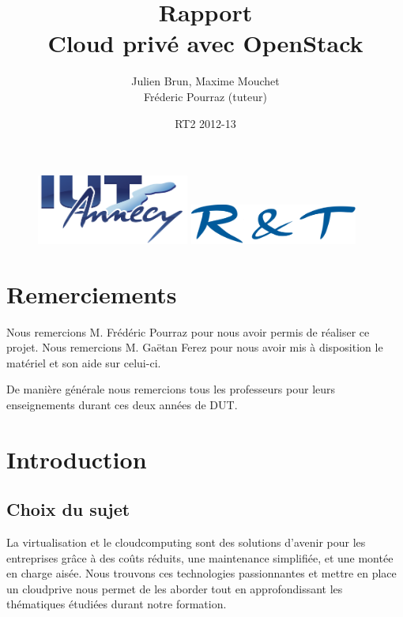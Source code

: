 \documentclass[a4paper,oneside]{report}
\title{Rapport \\ \og Cloud privé avec OpenStack \fg}
\author{Julien Brun, Maxime Mouchet \\ Fréderic Pourraz (tuteur)}
\date{RT2 2012-13}
\begin{document}
\begin{figure}
\includegraphics[width=5cm]{images/iut.png}\hfill
\includegraphics[width=5.5cm]{images/rt.png}
\end{figure}

\maketitle

\clearpage
\thispagestyle{empty}
\null\newpage

\chapter*{Remerciements}
\thispagestyle{empty}
\noindent Nous remercions M. Frédéric Pourraz pour nous avoir permis de réaliser ce projet.\newline
\noindent Nous remercions M. Gaëtan Ferez pour nous avoir mis à disposition le matériel et son aide sur celui-ci.

\noindent De manière générale nous remercions tous les professeurs pour leurs enseignements durant ces deux années de DUT.

\renewcommand{\contentsname}{Sommaire}
\setcounter{tocdepth}{1}
\tableofcontents

\chapter{Introduction}
\section{Choix du sujet}
La \gls{virtualisation} et le \gls{cloudcomputing} sont des solutions d'avenir pour les entreprises grâce à des coûts réduits, une maintenance simplifiée, et une montée en charge aisée.
Nous trouvons ces technologies passionnantes et mettre en place un \gls{cloudprive} nous permet de les aborder tout en approfondissant les thématiques étudiées durant notre formation.
\end{document}
